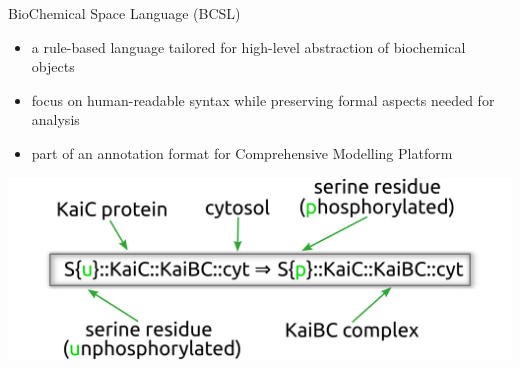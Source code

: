 \documentclass[10pt]{beamer}
\begin{document}

\begin{frame}[fragile]{BioChemical Space Language (BCSL)}

\begin{itemize}
	\item a rule-based language tailored for high-level abstraction of biochemical objects
	\item focus on human-readable syntax while preserving formal aspects needed for analysis
	\item part of an annotation format for Comprehensive Modelling Platform
\end{itemize}

\begin{center}
\hspace*{-0.7cm}\includegraphics[scale=0.45]{pics/equation.png}
\end{center}

\end{frame}

\end{document}
